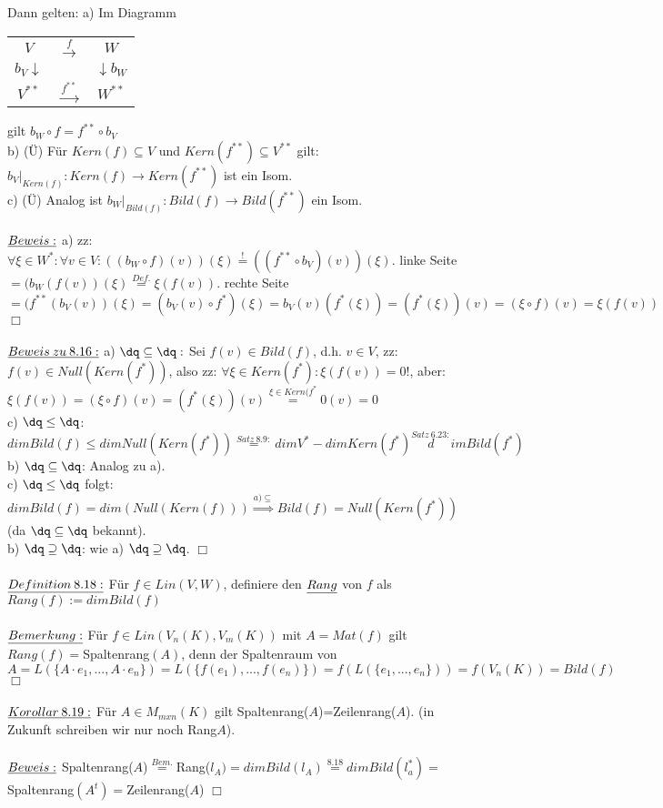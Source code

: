 \documentclass[fleqn, a4paper, 11pt]{scrartcl}
\theoremstyle{definition}
\begin{document}
Dann gelten: a) Im Diagramm \begin{tabular}{ccc}
	$V$ & $\stackrel{f}{\rightarrow}$ & $W$\\
	$b_V\downarrow$ & & $\downarrow b_W$\\
	$V^{\ast\ast}$ & $\stackrel{f^{\ast\ast}}{\rightarrow}$ & $W^{\ast\ast}$
\end{tabular} gilt $b_W\circ f=f^{\ast\ast}\circ b_V$\\
b) (\"U) Für $Kern(f)\subseteq V$ und $Kern(f^{\ast\ast})\subseteq V^{\ast\ast}$ gilt: $b_V|_{Kern(f)}:Kern(f)\rightarrow Kern(f^{\ast\ast})$ ist ein Isom.\\
c) (\"U) Analog ist $b_W|_{Bild(f)}:Bild(f)\rightarrow Bild(f^{\ast\ast})$ ein Isom.\\
\\
$\uline{Beweis:}$ a) zz: $\forall\xi\in W^{\ast}:\forall v\in V:((b_W\circ f)(v))(\xi)\stackrel{!}{=}((f^{\ast\ast}\circ b_V)(v))(\xi)$. linke Seite$=(b_W(f(v))(\xi)\stackrel{Def.}{=}\xi(f(v))$. rechte Seite$=(f^{\ast\ast}(b_V(v))(\xi)=(b_V(v)\circ f^{\ast})(\xi)=b_V(v)(f^{\ast}(\xi))=(f^{\ast}(\xi))(v)=(\xi\circ f)(v)=\xi(f(v))$ \hfill $\Box$\\
\\
$\uline{Beweis\:zu\:8.16:}$ a) $\dq \subseteq \dq:$ Sei $f(v)\in Bild(f)$, d.h. $v\in V$, zz: $f(v)\in Null(Kern(f^{\ast}))$, also zz: $\forall\xi\in Kern(f^{\ast}):\xi(f(v))=0!$, aber: $\xi(f(v))=(\xi\circ f)(v)=(f^{\ast}(\xi))(v)\stackrel{\xi\in Kern(f^{\ast}}{=} 0(v)=0$\\
c) $\dq \leq \dq$: $dim Bild(f) \leq dim Null(Kern(f^{\ast}))\stackrel{Satz\:8.9:}{=} dim V^{\ast} - dim Kern(f^{\ast})\stackrel{Satz\:6.23:}dim Bild(f^{\ast})$\\
b) $\dq \subseteq \dq$: Analog zu a).\\
c) $\dq \leq \dq$ folgt: $dim Bild(f)=dim(Null(Kern(f)))\stackrel{a)\subseteq}{\Rightarrow}Bild(f)=Null(Kern(f^{\ast}))$ (da $\dq\subseteq\dq$ bekannt).\\
b) $\dq\supseteq\dq$: wie a) $\dq\supseteq \dq$. \hfill $\Box$\\
\\
$\uline{Definition\:8.18:}$ Für $f\in Lin(V,W)$, definiere den $\uline{Rang}$ von $f$ als $Rang(f):=dim Bild(f)$\\
\\
$\uline{Bemerkung:}$ Für $f\in Lin(V_n(K),V_m(K))$ mit $A=Mat(f)$ gilt $Rang(f)=$Spaltenrang$(A)$, denn der Spaltenraum von $A=L(\{A\cdot e_1,...,A\cdot e_n\})=L(\{f(e_1),...,f(e_n)\})=f(L(\{e_1,...,e_n\}))=f(V_n(K))=Bild(f)$ \hfill $\Box$\\
\\
$\uline{Korollar\:8.19:}$ Für $A\in M_{mxn}(K)$ gilt Spaltenrang($A$)=Zeilenrang($A$). (in Zukunft schreiben wir nur noch Rang$A$).\\
\\
$\uline{Beweis:}$ Spaltenrang($A$)$\stackrel{Bem.}{=}$Rang($l_A)=dim Bild(l_A)\stackrel{8.18}{=} dim Bild(l_a^{\ast})=$Spaltenrang$(A^t)=$Zeilenrang($A$) \hfill $\Box$\\
\\
\newpage
\end{document}
